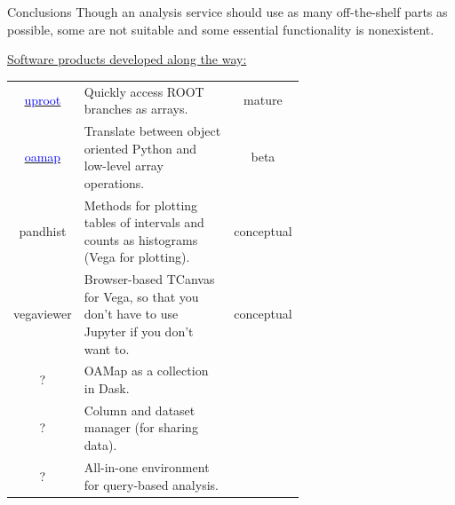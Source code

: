 \documentclass[aspectratio=169]{beamer}
\begin{document}
\begin{frame}{Conclusions}
\vspace{0.35 cm}
Though an analysis service should use as many off-the-shelf parts as possible, some are not suitable and some essential functionality is nonexistent.

\vspace{0.25 cm}
\underline{Software products developed along the way:}

\renewcommand{\arraystretch}{1.2}

\vspace{0.25 cm}
\begin{tabular}{c p{0.65\linewidth} c}
\href{https://github.com/scikit-hep/uproot}{\textcolor{blue}{uproot}} & Quickly access ROOT branches as arrays. & mature \\
\href{https://github.com/diana-hep/oamap}{\textcolor{blue}{oamap}} & Translate between object oriented Python and low-level array operations. & beta \\
pandhist & Methods for plotting tables of intervals and counts as histograms (Vega for plotting). & conceptual \\
vegaviewer & Browser-based TCanvas for Vega, so that you don't have to use Jupyter if you don't want to. & conceptual \\
? & OAMap as a collection in Dask. & \\
? & Column and dataset manager (for sharing data). & \\
? & All-in-one environment for query-based analysis. & \\
\end{tabular}
\end{frame}
\end{document}
